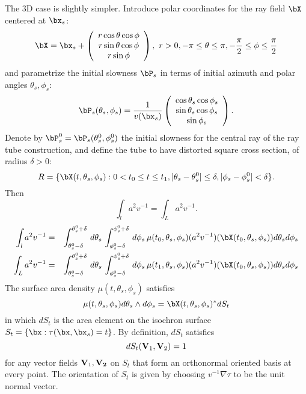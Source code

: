 The 3D case is slightly
simpler. Introduce polar coordinates for the ray field $\bX$ centered at $\bx_s$:
\[
\bX = \bx_s + 
\left(\begin{array}{c}
r \cos \theta \cos \phi\\
r \sin \theta \cos\phi\\
r \sin \phi 
\end{array}\right),
\,\,r > 0, -\pi \le \theta \le \pi, -\frac{\pi}{2} \le \phi \le 
\frac{\pi}{2}
\]
and parametrize the initial slowness $\bP_s$ in terms of initial
azimuth and polar angles $\theta_s,\phi_s$:
\[
\bP_s(\theta_s,\phi_s) = \frac{1}{v(\bx_s)}
\left(\begin{array}{c}
\cos \theta_s \cos \phi_s\\
\sin \theta_s \cos\phi_s\\
\sin \phi_s 
\end{array}\right).
\]
Denote by $\bP^0_s = \bP_s(\theta^0_s,\phi^0_s)$ the initial slowness
for the central ray of the ray tube construction, and define the tube
to have distorted square cross section, of radius $\delta > 0$:
\[
R = \{\bX(t,\theta_s,\phi_s): 0 < t_0 \le t \le t_1,
|\theta_s-\theta_s^0| \le \delta, |\phi_s-\phi_s^0|<\delta\}.
\]
Then
\begin{equation}
\label{eqn:transpsoln}
\int_{l} a^2 v^{-1} =\int_{L} a^2 v^{-1}. 
\end{equation}
\begin{eqnarray}
\label{eqn:tubeends}
\int_{l} a^2 v^{-1}  & = & \int_{\theta^0_s-\delta}^{\theta^0_s+\delta}\,d\theta_s \,
\int_{\phi^0_s-\delta}^{\phi^0_s+\delta}\,d\phi_s 
          \,\mu(t_0,\theta_s,\phi_s)
                           (a^2v^{-1})(\bX(t_0,\theta_s,\phi_s))d\theta_s
                           d\phi_s \nonumber \\
\int_{L} a^2 v^{-1} & = & \int_{\theta^0_s-\delta}^{\theta^0_s+\delta}\,d\theta_s \,
\int_{\phi^0_s-\delta}^{\phi^0_s+\delta}\,d\phi_s 
          \,\mu(t_1,\theta_s,\phi_s)
          (a^2v^{-1})(\bX(t_0,\theta_s,\phi_s)) d\theta_s d\phi_s
\end{eqnarray}
The surface area density $\mu(t,\theta_s,\phi_s)$ satisfies
\begin{equation}
\label{eqn:areaelt}
\mu(t,\theta_s,\phi_s)d\theta_s \wedge d\phi_s =
\bX(t,\theta_s,\phi_s)^*dS_t
\end{equation}
in which $dS_t$ is the area element on the isochron surface
$S_t = \{\bx:\tau(\bx,\bx_s) = t\}$. By definition, $dS_t$ satisfies 
\begin{equation}
\label{eqn:areaeltprop}
dS_t({\bf V}_1,{\bf V}_2) = 1
\end{equation}
for any vector fields ${\bf V}_1,{\bf V_2}$ on  $S_t$ that form an
orthonormal oriented basis at every point. The orientation of $S_t$ is
given by choosing $v^{-1}\nabla \tau$ to be the unit normal vector.

